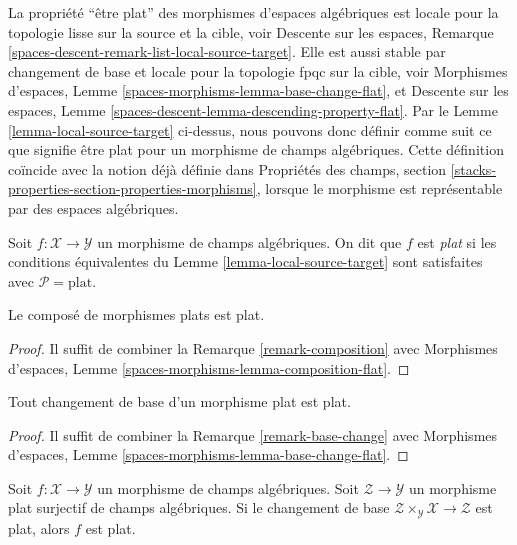 \noindent
La propriété ``être plat'' des morphismes d'espaces algébriques est locale
pour la topologie lisse sur la source et la cible, voir Descente sur les
espaces, Remarque \ref{spaces-descent-remark-list-local-source-target}.
Elle est aussi stable par changement de base et locale pour la topologie fpqc
sur la cible, voir Morphismes d'espaces,
Lemme \ref{spaces-morphisms-lemma-base-change-flat}, et Descente sur les
espaces, Lemme
\ref{spaces-descent-lemma-descending-property-flat}.
Par le Lemme \ref{lemma-local-source-target} ci-dessus, nous pouvons donc
définir comme suit ce que signifie être plat pour un morphisme de champs
algébriques. Cette définition coïncide avec la notion déjà définie dans
Propriétés des champs,
section \ref{stacks-properties-section-properties-morphisms}, lorsque le
morphisme est représentable par des espaces algébriques.

\begin{definition}
\label{definition-flat}
Soit $f : \mathcal{X} \to \mathcal{Y}$ un morphisme de champs algébriques.
On dit que $f$ est {\it plat} si les conditions équivalentes du
Lemme \ref{lemma-local-source-target} sont satisfaites avec
$\mathcal{P} = \text{plat}$.
\end{definition}

\begin{lemma}
\label{lemma-composition-flat}
Le composé de morphismes plats est plat.
\end{lemma}

\begin{proof}
Il suffit de combiner la Remarque \ref{remark-composition} avec Morphismes
d'espaces, Lemme
\ref{spaces-morphisms-lemma-composition-flat}.
\end{proof}

\begin{lemma}
\label{lemma-base-change-flat}
Tout changement de base d'un morphisme plat est plat.
\end{lemma}

\begin{proof}
Il suffit de combiner la Remarque \ref{remark-base-change} avec Morphismes
d'espaces, Lemme
\ref{spaces-morphisms-lemma-base-change-flat}.
\end{proof}

\begin{lemma}
\label{lemma-descent-flat}
Soit $f : \mathcal{X} \to \mathcal{Y}$ un morphisme de champs algébriques.
Soit $\mathcal{Z} \to \mathcal{Y}$ un morphisme plat surjectif de champs
algébriques. Si le changement de base
$\mathcal{Z} \times_\mathcal{Y} \mathcal{X} \to \mathcal{Z}$
est plat, alors $f$ est plat.
\end{lemma}

